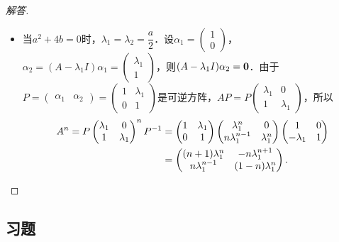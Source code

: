 \documentclass[a4paper,fontset=windows]{ctexbook}
\theoremstyle{definition}
\begin{document}
\begin{proof}[解答]
\begin{itemize}
\item 当$a^2+4b=0$时，$\lambda_1=\lambda_2=\dfrac{a}{2}$．设$\alpha_1=\begin{pmatrix}1 \\ 0\end{pmatrix}$，$\alpha_2=(A-\lambda_1I)\alpha_1=\begin{pmatrix}\lambda_1 \\ 1\end{pmatrix}$，则$(A-\lambda_1I)\alpha_2={\bf 0}$．由于$P=\begin{pmatrix}\alpha_1&\alpha_2\end{pmatrix}=\begin{pmatrix}1&\lambda_1 \\ 0&1\end{pmatrix}$是可逆方阵，$AP=P\begin{pmatrix}\lambda_1&0 \\ 1&\lambda_1\end{pmatrix}$，所以
\begin{align*}
A^n=P\begin{pmatrix}\lambda_1&0 \\ 1&\lambda_1\end{pmatrix}^nP^{-1}&=\begin{pmatrix}1&\lambda_1 \\ 0&1\end{pmatrix}\begin{pmatrix}\lambda_1^n&0 \\ n\lambda_1^{n-1}&\lambda_1^n\end{pmatrix}\begin{pmatrix}1&0 \\ -\lambda_1&1\end{pmatrix} \\
&=\begin{pmatrix}(n+1)\lambda_1^n&-n\lambda_1^{n+1} \\ n\lambda_1^{n-1}&(1-n)\lambda_1^n\end{pmatrix}.\qedhere
\end{align*}
\end{itemize}
\end{proof}

\subsection*{习题}
\end{document}
